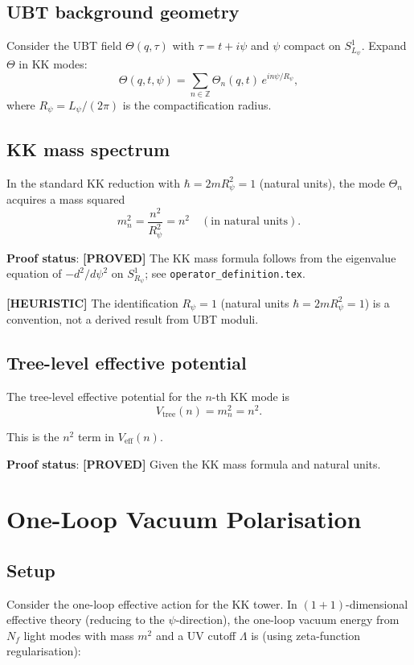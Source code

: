 \documentclass[11pt,a4paper]{article}
\newcommand{\proved}[1]{\textbf{[PROVED]} #1}
\newcommand{\heuristic}[1]{\textbf{[HEURISTIC]} #1}
\begin{document}
\subsection{UBT background geometry}

Consider the UBT field $\Theta(q, \tau)$ with $\tau = t + i\psi$ and $\psi$
compact on $S^1_{L_\psi}$.  Expand $\Theta$ in KK modes:
\[
  \Theta(q, t, \psi) = \sum_{n \in \mathbb{Z}} \Theta_n(q, t)\, e^{in\psi/R_\psi},
\]
where $R_\psi = L_\psi/(2\pi)$ is the compactification radius.

\subsection{KK mass spectrum}

In the standard KK reduction with $\hbar = 2mR_\psi^2 = 1$ (natural units), the
mode $\Theta_n$ acquires a mass squared
\[
  m_n^2 = \frac{n^2}{R_\psi^2} = n^2 \quad (\text{in natural units}).
\]

\textbf{Proof status}: \proved{The KK mass formula follows from the
eigenvalue equation of $-d^2/d\psi^2$ on $S^1_{R_\psi}$; see
\texttt{operator\_definition.tex}.}

\heuristic{The identification $R_\psi = 1$ (natural units $\hbar = 2mR_\psi^2 = 1$)
is a convention, not a derived result from UBT moduli.}

\subsection{Tree-level effective potential}

The tree-level effective potential for the $n$-th KK mode is
\[
  V_\mathrm{tree}(n) = m_n^2 = n^2.
\]

This is the $n^2$ term in $V_\mathrm{eff}(n)$.

\textbf{Proof status}: \proved{Given the KK mass formula and natural units.}

\section{One-Loop Vacuum Polarisation}

\subsection{Setup}

Consider the one-loop effective action for the KK tower.  In $(1+1)$-dimensional
effective theory (reducing to the $\psi$-direction), the one-loop vacuum energy
from $N_f$ light modes with mass $m^2$ and a UV cutoff $\Lambda$ is (using
zeta-function regularisation):
\end{document}
